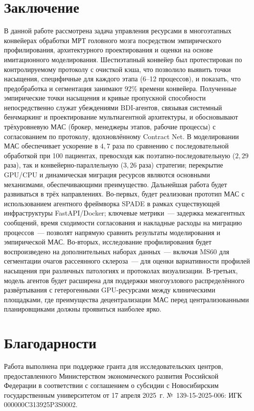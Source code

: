 \documentclass[conference]{IEEEtran}
\begin{document}
\section{Заключение}

В данной работе рассмотрена задача управления ресурсами в многоэтапных конвейерах обработки МРТ головного мозга посредством эмпирического профилирования, архитектурного проектирования и оценки на основе имитационного моделирования. Шестиэтапный конвейер был протестирован по контролируемому протоколу с очисткой кэша, что позволило выявить точки насыщения, специфичные для каждого этапа (6--12 процессов), и показать, что предобработка и сегментация занимают 92\% времени конвейера. Полученные эмпирические точки насыщения и кривые пропускной способности непосредственно служат убеждениями BDI-агентов, связывая системный бенчмаркинг и проектирование мультиагентной архитектуры, и обосновывают трёхуровневую МАС (брокер, менеджеры этапов, рабочие процессы) с согласованием по протоколу, вдохновлённому Contract Net. В моделировании МАС обеспечивает ускорение в $4{,}7$ раза по сравнению с последовательной обработкой при 100 пациентах, превосходя как поэтапно-последовательную ($2{,}29$ раза), так и конвейерно-параллельную ($3{,}26$ раза) стратегии; перекрытие GPU/CPU и динамическая миграция ресурсов являются основными механизмами, обеспечивающими преимущество. Дальнейшая работа будет развиваться в трёх направлениях. Во-первых, будет реализован прототип МАС с использованием агентного фреймворка SPADE в рамках существующей инфраструктуры FastAPI/Docker; ключевые метрики~--- задержка межагентных сообщений, время сходимости согласования и накладные расходы на миграцию процессов~--- позволят напрямую сравнить результаты моделирования и эмпирической МАС. Во-вторых, исследование профилирования будет воспроизведено на дополнительных наборах данных~--- включая MS60 для сегментации очагов рассеянного склероза~--- для оценки вариативности профилей насыщения при различных патологиях и протоколах визуализации. В-третьих, модель агентов будет расширена для поддержки многоузлового распределённого развёртывания с гетерогенными GPU-ресурсами между клиническими площадками, где преимущества децентрализации МАС перед централизованными планировщиками должны проявиться наиболее ярко.

\section*{Благодарности}

Работа выполнена при поддержке гранта для исследовательских центров, предоставленного Министерством экономического развития Российской Федерации в соответствии с соглашением о субсидии с Новосибирским государственным университетом от 17 апреля 2025~г. №~139-15-2025-006: ИГК 000000C313925P3S0002.
\end{document}
